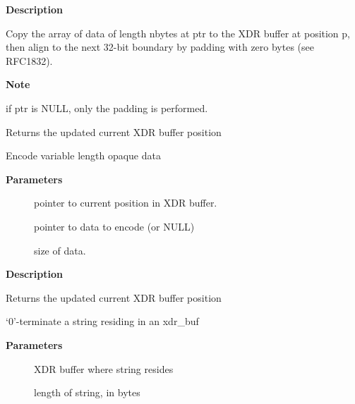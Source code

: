 \documentclass[a4paper,8pt,english]{sphinxmanual}
\begin{document}
\textbf{Description}

Copy the array of data of length nbytes at ptr to the XDR buffer
at position p, then align to the next 32-bit boundary by padding
with zero bytes (see RFC1832).

\textbf{Note}

if ptr is NULL, only the padding is performed.

Returns the updated current XDR buffer position

\begin{fulllineitems}
\label{networking/kapi:c.xdr_encode_opaque}
Encode variable length opaque data

\end{fulllineitems}


\textbf{Parameters}
\begin{description}
\item[{}] \leavevmode
pointer to current position in XDR buffer.

\item[{}] \leavevmode
pointer to data to encode (or NULL)

\item[{}] \leavevmode
size of data.

\end{description}

\textbf{Description}

Returns the updated current XDR buffer position

\begin{fulllineitems}
\label{networking/kapi:c.xdr_terminate_string}
`0'-terminate a string residing in an xdr\_buf

\end{fulllineitems}


\textbf{Parameters}
\begin{description}
\item[{}] \leavevmode
XDR buffer where string resides

\item[{}] \leavevmode
length of string, in bytes

\end{description}
\end{document}
